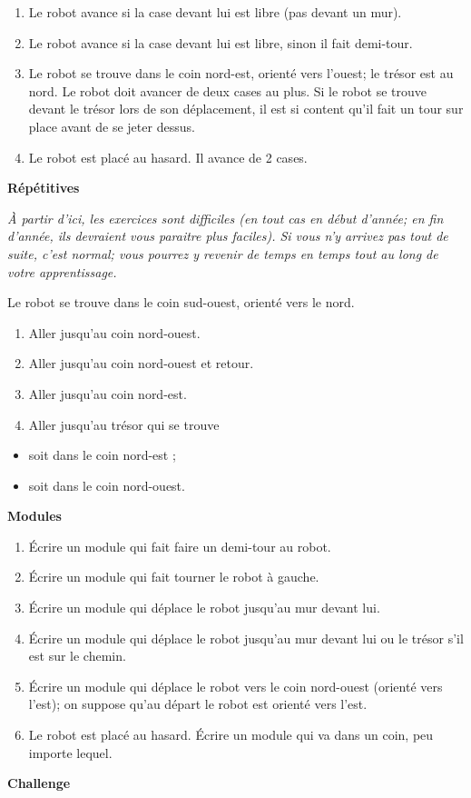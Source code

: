 \liststyleExercice
\setcounter{saveenum}{\value{enumi}}
\begin{enumerate}
\setcounter{enumi}{\value{saveenum}}
\item {
Le robot avance si la case devant lui est libre (pas devant un mur).}
\item {
Le robot avance si la case devant lui est libre, sinon il fait
demi-tour.}
\item {
Le robot se trouve dans le coin nord-est, orienté vers
l'ouest; le trésor est au nord. Le robot doit avancer
de deux cases au plus. Si le robot se trouve devant le trésor lors de
son déplacement, il est si content qu'il fait un tour
sur place avant de se jeter dessus.}
\item {
Le robot est placé au hasard. Il avance de 2 cases.}
\end{enumerate}
{\sffamily\bfseries\upshape
Répétitives}

{\itshape
À partir d'ici, les exercices sont difficiles (en tout
cas en début d'année; en fin d'année,
ils devraient vous paraitre plus faciles). Si vous n'y
arrivez pas tout de suite, c'est normal; vous pourrez
y revenir de temps en temps tout au long de votre apprentissage.}

{
Le robot se trouve dans le coin sud-ouest, orienté vers le nord. }

\liststyleExercice
\setcounter{saveenum}{\value{enumi}}
\begin{enumerate}
\setcounter{enumi}{\value{saveenum}}
\item {
Aller jusqu'au coin nord-ouest. }
\item {
Aller jusqu'au coin nord-ouest et retour. }
\item {
Aller jusqu'au coin nord-est. }
\item {
Aller jusqu'au trésor qui se trouve }
\end{enumerate}
\liststyleLii
\begin{itemize}
\item {
soit dans le coin nord-est ; }
\item {
soit dans le coin nord-ouest. }
\end{itemize}
{\sffamily\bfseries\upshape
Modules}

\liststyleExercice
\begin{enumerate}
\item {
Écrire un module qui fait faire un demi-tour au robot.}
\item {
Écrire un module qui fait tourner le robot à gauche.}
\item {
Écrire un module qui déplace le robot jusqu'au mur
devant lui.}
\item {
Écrire un module qui déplace le robot jusqu'au mur
devant lui ou le trésor s'il est sur le chemin.}
\item {
Écrire un module qui déplace le robot vers le coin nord-ouest (orienté
vers l'est); on suppose qu'au départ
le robot est orienté vers l'est.}
\item {
Le robot est placé au hasard. Écrire un module qui va dans un coin, peu
importe lequel. }
\end{enumerate}
{\sffamily\bfseries
Challenge}

